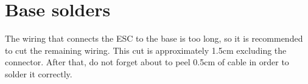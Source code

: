 \documentclass[12pt, a4paper,twoside]{tesi_upf}
\begin{document}
\noindent%
\begin{minipage}{\linewidth}
\vspace{10 mm}
\label{mobilenode1}
\end{minipage}    


\section{Base solders}

The wiring that connects the ESC to the base is too long, so it is recommended to cut the remaining wiring. This cut is approximately 1.5cm excluding the connector. After that, do not forget about to peel 0.5cm of cable in order to solder it correctly.
\\[12 pt]
\end{document}
